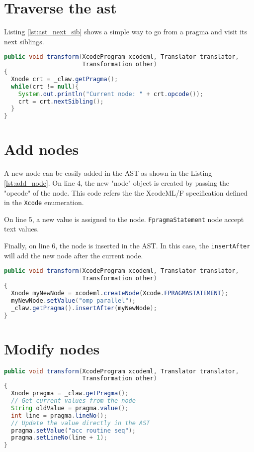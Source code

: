 \section{Traverse the \gls{ast}}
Listing \ref{lst:ast_next_sib} shows a simple way to go from a pragma and visit 
its next siblings.

\begin{lstlisting}[label=lst:ast_next_sib, language=Java, 
  caption=XcodeML AST traverse]
public void transform(XcodeProgram xcodeml, Translator translator,
                      Transformation other)
{
  Xnode crt = _claw.getPragma();
  while(crt != null){
    System.out.println("Current node: " + crt.opcode());
    crt = crt.nextSibling();          
  }
}
\end{lstlisting}

\section{Add nodes}
A new node can be easily added in the AST as shown in the Listing 
\ref{lst:add_node}. On line 4, the new "node" object is created by
passing the "opcode" of the node. This code refers the the XcodeML/F 
specification defined in the \lstinline!Xcode! enumeration.

On line 5, a new value is assigned to the node. \lstinline!FpragmaStatement! 
node accept text values.

Finally, on line 6, the node is inserted in the AST. In this case, 
the \lstinline!insertAfter! will add the new node after the current node.

\begin{lstlisting}[label=lst:add_node, language=Java, 
  caption=XcodeML add node example]
public void transform(XcodeProgram xcodeml, Translator translator,
                      Transformation other)
{
  Xnode myNewNode = xcodeml.createNode(Xcode.FPRAGMASTATEMENT);
  myNewNode.setValue("omp parallel");
  _claw.getPragma().insertAfter(myNewNode);
}
\end{lstlisting}

\section{Modify nodes}

\begin{lstlisting}[label=lst:update_node, language=Java, 
  caption=XcodeML update node example]
public void transform(XcodeProgram xcodeml, Translator translator,
                      Transformation other)
{
  Xnode pragma = _claw.getPragma();
  // Get current values from the node
  String oldValue = pragma.value();
  int line = pragma.lineNo();
  // Update the value directly in the AST
  pragma.setValue("acc routine seq");
  pragma.setLineNo(line + 1);
}
\end{lstlisting}

